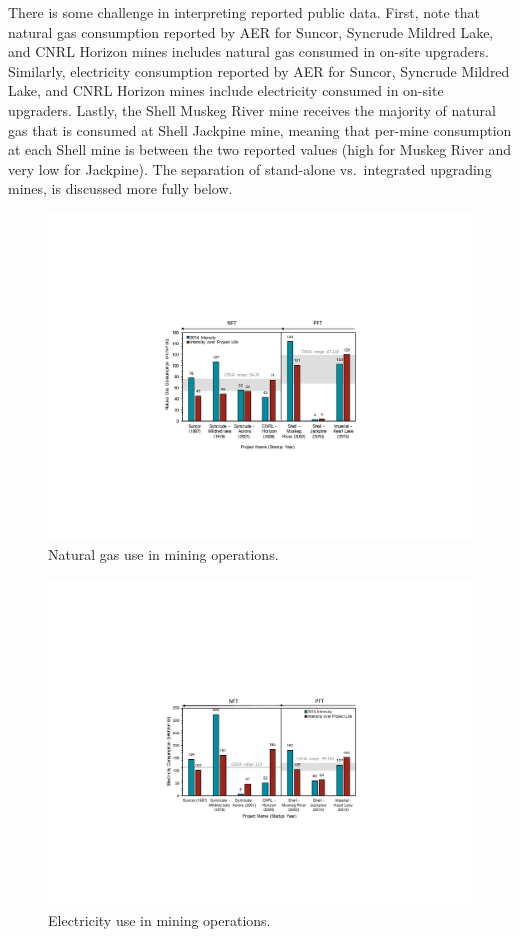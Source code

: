 \documentclass[11pt]{report}
\begin{document}
There is some challenge in interpreting reported public data. First, note that natural gas consumption reported by AER for Suncor, Syncrude Mildred Lake, and CNRL Horizon mines includes natural gas consumed in on-site upgraders. Similarly, electricity consumption reported by AER for Suncor, Syncrude Mildred Lake, and CNRL Horizon mines include electricity consumed in on-site upgraders. Lastly, the Shell Muskeg River mine receives the majority of natural gas that is consumed at Shell Jackpine mine, meaning that per-mine consumption at each Shell mine is between the two reported values (high for Muskeg River and very low for Jackpine).  The separation of stand-alone vs.\ integrated upgrading mines, is discussed more fully below.


\begin{figure}[t]
\includegraphics[width=1\columnwidth]{images/mining_ng.pdf}
\caption{Natural gas use in mining operations.}
\label{fig:mining_ng}
\end{figure}


\begin{figure}[t]
\includegraphics[width=1\columnwidth]{images/mining_elec.pdf}
\caption{Electricity use in mining operations.}
\label{fig:mining_elec}
\end{figure}
\end{document}
